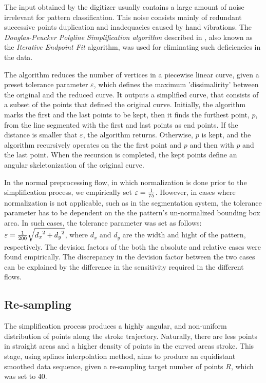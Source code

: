 \iftoggle{edit-mode}{\hspace{0pt}\marginpar{Introduction}}{}
The input obtained by the digitizer usually contains a large amount of noise irrelevant for pattern classification. 
This noise consists mainly of redundant successive points duplication and inadequacies caused by hand vibrations. 
The \emph{Douglas-Peucker Polyline Simplification algorithm} described in \cite{douglas1973algorithms}, also known as the \emph{Iterative Endpoint Fit} algorithm, was used for eliminating such deficiencies in the data. 

\iftoggle{edit-mode}{\hspace{0pt}\marginpar{The Douglas-Peucker algorithm}}{}
The algorithm reduces the number of vertices in a piecewise linear curve, given a preset tolerance parameter $\varepsilon$, which defines the maximum 'dissimalirity' between the original and the reduced curve.
It outputs a simplified curve, that consists of a subset of the points that defined the original curve.
Initially, the algorithm marks the first and the last points to be kept, then it finds the furthest point, $p$, from the line segmented with the first and last points as end points.
If the distance is smaller that $\varepsilon$, the algorithm returns. Otherwise, $p$ is kept, and the algorithm recursively operates on the the first point and $p$ and then with $p$ and the last point.
When the recursion is completed, the kept points define an angular skeletonization of the original curve.

\iftoggle{edit-mode}{\hspace{0pt}\marginpar{Different tolerance parameters}}{}
In the normal preprocessing flow, in which normalization is done prior to the simplification process, we empirically set $\varepsilon  = {1 \over 75}$.
However, in cases where normalization is not applicable, such as in the segmentation system, the tolerance parameter has to be dependent on the the pattern's un-normalized bounding box area. 
In such cases, the tolerance parameter was set as follows: $\varepsilon  = {1 \over {200}}\sqrt {{d_x}^2 + {d_y}^2}$, where $d_x$ and $d_y$ are the width and hight of the pattern, respectively. 
The devision factors of the both the absolute and relative cases were found empirically. 
The discrepancy in the devision factor between the two cases can be explained by the difference in the sensitivity required in the different flows. 

\subsection{Re-sampling}
\iftoggle{edit-mode}{\hspace{0pt}\marginpar{Goal}}{}
The simplification process produces a highly angular, and non-uniform distribution of points along the stroke trajectory.
Naturally, there are less points in straight areas and a higher density of points in the curved areas stroke. 
This stage, using splines interpolation method, aims to produce an equidistant smoothed data sequence, given a re-sampling target number of points $R$, which was set to 40. 

